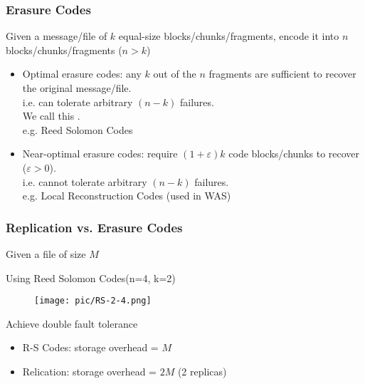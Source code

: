 \documentclass[slidestop,compress,mathserif]{beamer}
\begin{document}
\begin{frame}[options]
\frametitle{Erasure Codes}

Given a message/file of $k$ equal-size blocks/chunks/fragments, encode it into $n$ blocks/chunks/fragments ($n > k$)

\begin{itemize}
  \item Optimal erasure codes: any $k$ out of the $n$ fragments are sufficient to recover the original message/file. \\
	i.e. can tolerate arbitrary $(n-k)$ failures. \\
	We call this {\color{red}{(n,k) MDS (maximum distance separable) property}}. \\
	e.g. Reed Solomon Codes
  \item Near-optimal erasure codes: require $( 1 + \varepsilon )k$ code blocks/chunks to recover ($\varepsilon > 0$). \\
	i.e. cannot tolerate arbitrary $(n-k)$ failures. \\
  	e.g. Local Reconstruction Codes (used in WAS)
\end{itemize}

\end{frame}

\begin{frame}[options]
\frametitle{Replication vs. Erasure Codes}

Given a file of size $M$

Using Reed Solomon Codes(n=4, k=2)
\begin{figure}[ht!]
  \texttt{[image: pic/RS-2-4.png]}
\end{figure}

Achieve double fault tolerance
\begin{itemize}
  \item R-S Codes: storage overhead = $M$
  \item Relication: storage overhead = $2M$ (2 replicas)
\end{itemize}
\end{frame}
\end{document}
